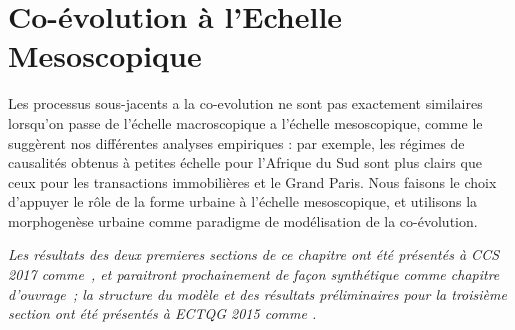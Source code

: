 

\chapter{Co-évolution à l'Echelle Mesoscopique}


\label{ch:mesocoevolution} 




Les processus sous-jacents a la co-evolution ne sont pas exactement similaires lorsqu'on passe de l'échelle macroscopique a l'échelle mesoscopique, comme le suggèrent nos différentes analyses empiriques : par exemple, les régimes de causalités obtenus à petites échelle pour l'Afrique du Sud sont plus clairs que ceux pour les transactions immobilières et le Grand Paris. Nous faisons le choix d'appuyer le rôle de la forme urbaine à l'échelle mesoscopique, et utilisons la morphogenèse urbaine comme paradigme de modélisation de la co-évolution.





















\stars


\textit{Les résultats des deux premieres sections de ce chapitre ont été présentés à CCS 2017 comme~\cite{}, et paraitront prochainement de façon synthétique comme chapitre d'ouvrage~\cite{}; la structure du modèle et des résultats préliminaires pour la troisième section ont été présentés à ECTQG 2015 comme \cite{le2015modeling}.}






